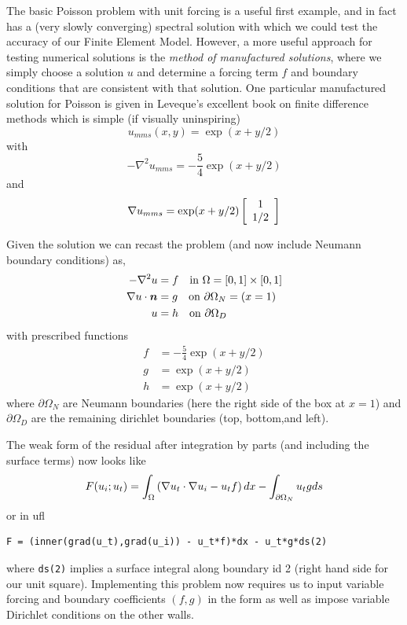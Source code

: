The basic Poisson problem with unit forcing is a useful first example,
and in fact has a (very slowly converging) spectral solution with
which we could test the accuracy of our Finite Element Model.
However, a more useful approach for testing numerical solutions is the
\emph{method of manufactured solutions}, where we simply choose a
solution $u$ and determine a forcing term $f$ and boundary conditions
that are consistent with that solution.  One particular manufactured
solution for Poisson is given in Leveque's excellent book on finite
difference methods \cite{leveque_finite_2007} which is simple (if
visually uninspiring)
\begin{equation}
  \label{eq:13}
  u_{mms}(x,y) = \exp(x + y/2)
\end{equation}
with
\begin{equation}
  \label{eq:14}
  -\nabla^{2} u_{mms} = -\frac{5}{4}\exp(x+y/2)
\end{equation}
and
\begin{equation}
  \label{eq:15}
  \nabla u_{mms} = \exp(x+y/2)
  \left[
    \begin{array}{c}
 1 \\
1/2\\
\end{array}
  \right]
\end{equation}

Given the solution we can recast the problem (and now include  Neumann boundary conditions) as,
\begin{align}
  \label{eq:16}
-\nabla^2u &= f \quad\text{in } \Omega=[0,1]\times[0,1] \nonumber\\
\nabla u\cdot{\mbox{\boldmath$n$}} & = g \quad\text{on } \partial\Omega_{N}=(x=1)\\
 u &= h \quad\text{on } \partial\Omega_{D}\nonumber
\end{align}
with  prescribed functions
\begin{align}
  \label{eq:17}
  f &= -\frac{5}{4}\exp(x+y/2)\nonumber\\
  g & = \exp(x+y/2)\\
  h &=  \exp(x+y/2)\nonumber
\end{align}
where $\partial\Omega_{N}$ are Neumann boundaries (here the right side
of the box at $x=1$) and $\partial\Omega_{D}$ are the remaining dirichlet boundaries (top, bottom,and left).

The weak form of the residual after integration by parts (and
including the surface terms) now looks like
\begin{equation}
  \label{eq:4}
  F(u_{i};u_{t}) = \int_{\Omega}
  \left(
    \nabla u_{t}\cdot\nabla u_{i} - u_{t}f
  \right)dx - \int_{\partial\Omega_{N}} u_{t}g ds
\end{equation}
or in ufl
\begin{lstlisting}[style=ufl]
F = (inner(grad(u_t),grad(u_i)) - u_t*f)*dx - u_t*g*ds(2)
\end{lstlisting}
where \texttt{ds(2)} implies a surface integral along boundary id 2
(right hand side for our unit square). Implementing this problem now
requires us to input variable forcing and boundary coefficients
$(f,g)$ in the form as well as impose variable Dirichlet conditions on
the other walls.

